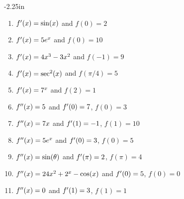 \begin{adjustwidth*}{}{-2.25in}
\begin{multicols*}{2}

\begin{enumerate}[1),start=28]
\item $f'(x) = \sin (x)$ and $f(0)= 2$
\item $f'(x) = 5e^x$ and $f(0)= 10$
\item $f'(x) = 4x^3-3x^2$ and $f(-1)= 9$
\item $f'(x) = \sec^2 (x)$ and $f(\pi/4)= 5$
\item $f'(x) = 7^x$ and $f(2)= 1$
\item $f''(x) = 5$ and $f'(0)= 7$, $f(0) = 3$
\item $f''(x) = 7x$ and $f'(1)= -1$, $f(1) = 10$
\item $f''(x) = 5e^x$ and $f'(0)= 3$, $f(0) = 5$
\item $f''(x) = \sin (\theta)$ and $f'(\pi)= 2$, $f(\pi) = 4$
\item $f''(x) = 24x^2+2^x-\cos (x)$ and $f'(0)= 5$, $f(0) = 0$
\item $f''(x) = 0$ and $f'(1)= 3$, $f(1) = 1$
\end{enumerate}



\end{multicols*}
\end{adjustwidth*}
